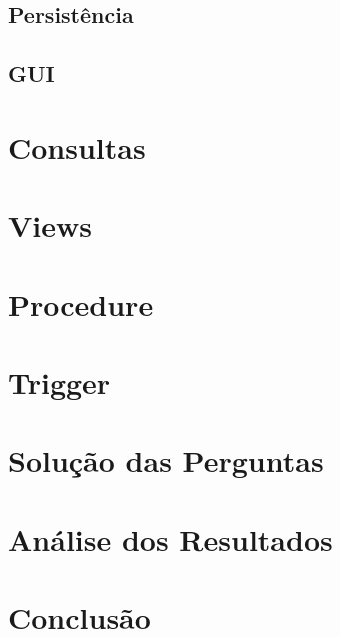 \documentclass[12pt]{article}
\begin{document}
	\subsection{Persistência}
	\label{sec:pers}
	
	\subsection{GUI}
	\label{sec:gui}
	
	\section{Consultas} 
	\label{sec:consultas}
	
	\section{Views}
	\label{sec:views}
	
	\section{Procedure}
	\label{sec:procedure}
	
	\section{Trigger}
	\label{sec:trigger}
	
	\section{Solução das Perguntas}
	\label{sec:analisep}
	
	\section{Análise dos Resultados}
	\label{sec:resultados}
	
	\section{Conclusão}
	\label{sec:conclusao}
	

 

	
\end{document}
